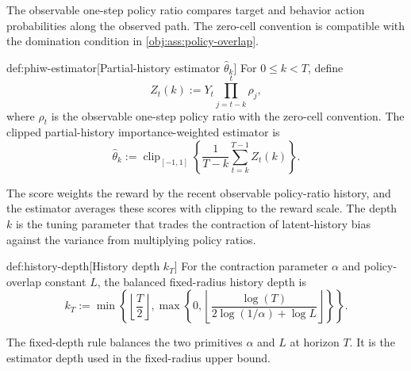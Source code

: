 The observable one-step policy ratio  compares target and behavior action probabilities along the observed path. The zero-cell convention is compatible with the domination condition in \cref{obj:ass:policy-overlap}.

\begin{definitionv}{def:phiw-estimator}[Partial-history estimator \(\widehat\theta_k\)]
For \(0\le k<T\), define
\[
Z_t(k)
:=
Y_t\prod_{j=t-k}^{t}\rho_j,
\]
where \(\rho_t\) is the observable one-step policy ratio with the zero-cell convention. The clipped partial-history importance-weighted estimator is
\[
\widehat\theta_k
:=
\operatorname{clip}_{[-1,1]}
\left\{
\frac{1}{T-k}\sum_{t=k}^{T-1} Z_t(k)
\right\}.
\]
\end{definitionv}

The score  weights the reward by the recent observable policy-ratio history, and the estimator  averages these scores with clipping to the reward scale. The depth \(k\) is the tuning parameter that trades the contraction of latent-history bias against the variance from multiplying policy ratios.

\begin{definitionv}{def:history-depth}[History depth \(k_T\)]
For the contraction parameter \(\alpha\) and policy-overlap constant \(L\), the balanced fixed-radius history depth is
\[
k_T
:=
\min\left\{
\left\lfloor\frac{T}{2}\right\rfloor,
\max\left\{
0,
\left\lfloor
\frac{\log(T)}{2\log(1/\alpha)+\log L}
\right\rfloor
\right\}
\right\}.
\]
\end{definitionv}

The fixed-depth rule  balances the two primitives \(\alpha\) and \(L\) at horizon \(T\). It is the estimator depth used in the fixed-radius upper bound.

